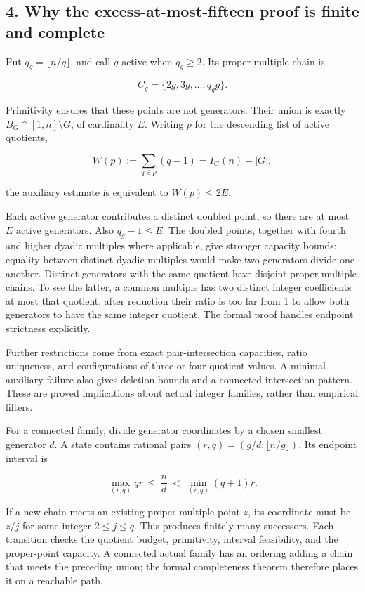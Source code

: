 \documentclass[
  11pt,
]{article}
\begin{document}
\hypertarget{why-the-excess-at-most-fifteen-proof-is-finite-and-complete}{%
\subsection{4. Why the excess-at-most-fifteen proof is finite and
complete}\label{why-the-excess-at-most-fifteen-proof-is-finite-and-complete}}

Put \(q_g=\lfloor n/g\rfloor\), and call \(g\) active when \(q_g\ge2\).
Its proper-multiple chain is

\[
C_g=\{2g,3g,\ldots,q_gg\}.
\]

Primitivity ensures that these points are not generators. Their union is
exactly \(B_G\cap[1,n]\setminus G\), of cardinality \(E\). Writing \(p\)
for the descending list of active quotients,

\[
W(p):=\sum_{q\in p}(q-1)=I_G(n)-|G|,
\]

the auxiliary estimate is equivalent to \(W(p)\le2E\).

Each active generator contributes a distinct doubled point, so there are
at most \(E\) active generators. Also \(q_g-1\le E\). The doubled
points, together with fourth and higher dyadic multiples where
applicable, give stronger capacity bounds: equality between distinct
dyadic multiples would make two generators divide one another. Distinct
generators with the same quotient have disjoint proper-multiple chains.
To see the latter, a common multiple has two distinct integer
coefficients at most that quotient; after reduction their ratio is too
far from 1 to allow both generators to have the same integer quotient.
The formal proof handles endpoint strictness explicitly.

Further restrictions come from exact pair-intersection capacities, ratio
uniqueness, and configurations of three or four quotient values. A
minimal auxiliary failure also gives deletion bounds and a connected
intersection pattern. These are proved implications about actual integer
families, rather than empirical filters.

For a connected family, divide generator coordinates by a chosen
smallest generator \(d\). A state contains rational pairs
\((r,q)=(g/d,\lfloor n/g\rfloor)\). Its endpoint interval is

\[
\max_{(r,q)} qr\ \le\ \frac nd\ <\ \min_{(r,q)}(q+1)r. \tag{8}
\]

If a new chain meets an existing proper-multiple point \(z\), its
coordinate must be \(z/j\) for some integer \(2\le j\le q\). This
produces finitely many successors. Each transition checks the quotient
budget, primitivity, interval feasibility, and the proper-point
capacity. A connected actual family has an ordering adding a chain that
meets the preceding union; the formal completeness theorem therefore
places it on a reachable path.
\end{document}
